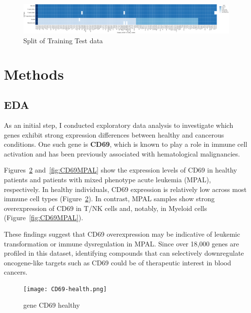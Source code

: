 \documentclass[11pt, oneside]{article}   	%
\begin{document}
\begin{figure}[htbp]
  \centering
  \includegraphics[width=1.0 \textwidth, height=0.3 \textwidth ]{train-test-split.png}
  \caption{Split of Training Test data}
  \label{fig:traintest}
\end{figure}



\section*{Methods}

\subsection{EDA}

As an initial step, I conducted exploratory data analysis to investigate which genes exhibit strong expression differences between healthy and cancerous conditions. One such gene is \textbf{CD69}, which is known to play a role in immune cell activation and has been previously associated with hematological malignancies.

Figures~\ref{fig:CD69healthy} and~\ref{fig:CD69MPAL} show the expression levels of CD69 in healthy patients and patients with mixed phenotype acute leukemia (MPAL), respectively. In healthy individuals, CD69 expression is relatively low across most immune cell types (Figure~\ref{fig:CD69healthy}). In contrast, MPAL samples show strong overexpression of CD69 in T/NK cells and, notably, in Myeloid cells (Figure~\ref{fig:CD69MPAL}).

These findings suggest that CD69 overexpression may be indicative of leukemic transformation or immune dysregulation in MPAL. Since over 18,000 genes are profiled in this dataset, identifying compounds that can selectively downregulate oncogene-like targets such as CD69 could be of therapeutic interest in blood cancers.

\begin{figure}[htbp]
  \centering
  \texttt{[image: CD69-health.png]}
  \caption{gene CD69 healthy}
  \label{fig:CD69healthy}
\end{figure}
\end{document}
